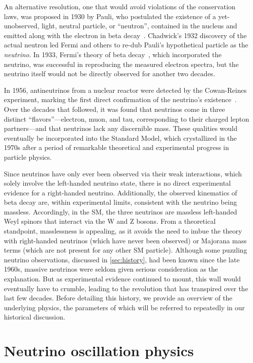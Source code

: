 \documentclass[../thesis.tex]{subfiles}
\begin{document}
An alternative resolution, one that would avoid violations of the conservation laws, was proposed in 1930 by Pauli, who postulated the existence of a yet-unobserved, light, neutral particle, or ``neutron'', contained in the nucleus and emitted along with the electron in beta decay~\cite{Pauli:83282}. Chadwick's 1932 discovery of the actual neutron led Fermi and others to re-dub Pauli's hypothetical particle as the \emph{neutrino}. In 1933, Fermi's theory of beta decay~\cite{Fermi1934TentativoDU}, which incorporated the neutrino, was successful in reproducing the measured electron spectra, but the neutrino itself would not be directly observed for another two decades.

In 1956, antineutrinos from a nuclear reactor were detected by the Cowan-Reines experiment, marking the first direct confirmation of the neutrino's existence~\cite{Cowan103}. Over the decades that followed, it was found that neutrinos come in three distinct ``flavors''---electron, muon, and tau, corresponding to their charged lepton partners---and that neutrinos lack any discernible mass. These qualities would eventually be incorporated into the Standard Model, which crystallized in the 1970s after a period of remarkable theoretical and experimental progress in particle physics.

Since neutrinos have only ever been observed via their weak interactions, which solely involve the left-handed neutrino state, there is no direct experimental evidence for a right-handed neutrino. Additionally, the observed kinematics of beta decay are, within experimental limits, consistent with the neutrino being massless. Accordingly, in the SM, the three neutrinos are massless left-handed Weyl spinors that interact via the W and Z bosons. From a theoretical standpoint, masslessness is appealing, as it avoids the need to imbue the theory with right-handed neutrinos (which have never been observed) or Majorana mass terms (which are not present for any other SM particle). Although some puzzling neutrino observations, discussed in \autoref{sec:history}, had been known since the late 1960s, massive neutrinos were seldom given serious consideration as the explanation. But as experimental evidence continued to mount, this wall would eventually have to crumble, leading to the revolution that has transpired over the last few decades. Before detailing this history, we provide an overview of the underlying physics, the parameters of which will be referred to repeatedly in our historical discussion.


\section{Neutrino oscillation physics}
\label{sec:oscPhysics}
\end{document}
